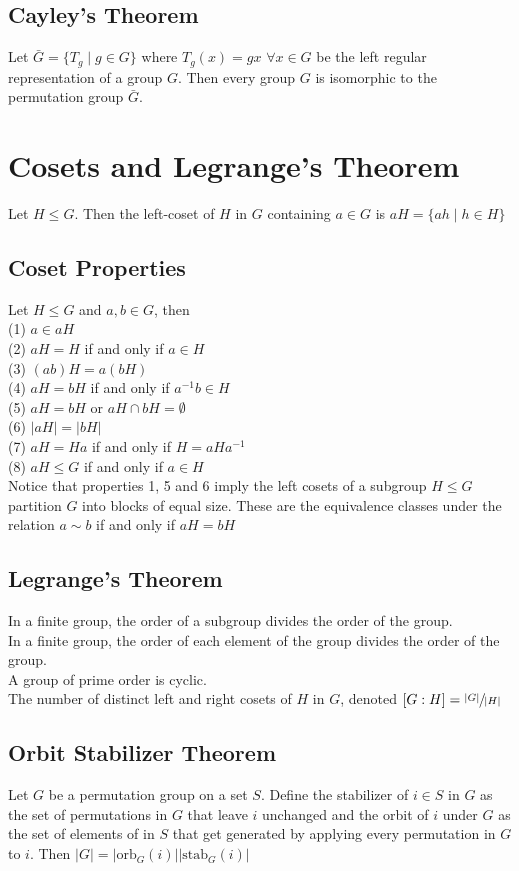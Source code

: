 \documentclass{article}
\begin{document}
\subsection{Cayley's Theorem}
Let $\bar{G} =\{T_g \mid g \in G\}$ where $T_g(x) = gx$ $\forall x \in G$ be the left regular representation of a group $G$. Then every group $G$ is isomorphic to the permutation group $\bar{G}$.


\section{Cosets and Legrange's Theorem}
Let $H \leq G$. Then the left-coset of $H$ in $G$ containing $a \in G$ is $aH = \{ah \mid h \in H\}$ 
\subsection{Coset Properties}
Let $H \leq G$ and $a, b \in G$, then \\
(1) $a \in aH$ \\
(2) $aH = H$ if and only if $a \in H$ \\
(3) $(ab)H = a(bH)$ \\
(4) $aH = bH$ if and only if $a^{-1}b \in H$ \\
(5) $aH = bH$ or $aH \cap bH = \emptyset$ \\
(6) $|aH| = |bH|$ \\
(7) $aH = Ha$ if and only if $H = aHa^{-1}$ \\
(8) $aH \leq G$ if and only if $a \in H$ \\
Notice that properties 1, 5 and 6 imply the left cosets of a subgroup $H \leq G$ partition $G$ into blocks of equal size. These are the equivalence classes under the relation $a \sim b$ if and only if $aH = bH$
\subsection{Legrange's Theorem}
In a finite group, the order of a subgroup divides the order of the group. \\
In a finite group, the order of each element of the group divides the order of the group. \\
A group of prime order is cyclic. \\
The number of distinct left and right cosets of $H$ in $G$, denoted $[G:H] = \sfrac{|G|}{|H|}$ 
\subsection{Orbit Stabilizer Theorem}
Let $G$ be a permutation group on a set $S$. Define the stabilizer of $i \in S$ in $G$ as the set of permutations in $G$ that leave $i$ unchanged and the orbit of $i$ under $G$ as the set of elements of in $S$ that get generated by applying every permutation in $G$ to $i$. Then $|G| = |\mbox{orb}_G(i)| |\mbox{stab}_G(i)|$
\end{document}
